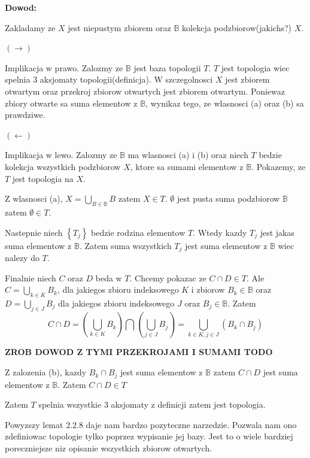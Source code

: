 \documentclass{article}
\begin{document}
\textbf{Dowod:}

Zakladamy ze $X$ jest niepustym zbiorem oraz $\mathbb{B}$ kolekcja podzbiorow(jakichs?) $X$.

$(\rightarrow)$

Implikacja w prawo. Zalozmy ze $\mathbb{B}$ jest baza topologii $T$. $T$ jest topologia wiec spelnia 3 aksjomaty topologii(definicja). W szczegolnosci $X$ jest zbiorem otwartym oraz przekroj zbiorow otwartych jest zbiorem otwartym. Poniewaz zbiory otwarte sa suma elementow z $\mathbb{B}$, wynikaz tego, ze wlasnosci (a) oraz (b) sa prawdziwe.

$(\leftarrow)$

Implikacja w lewo. Zalozmy ze $\mathbb{B}$ ma wlasnosci (a) i (b) oraz niech $T$ bedzie kolekcja wszystkich podzbiorow $X$, ktore sa sumami elementow z $\mathbb{B}$. Pokazemy, ze $T$ jest topologia na $X$.

Z wlasnosci (a), $X = \bigcup\limits_{B \in \mathbb{B}}B$ zatem  $X \in T$. $\emptyset$ jest pusta suma podzbiorow $\mathbb{B}$ zatem $\emptyset \in T$.

Nastepnie niech $\left\{ T_{j} \right\}$ bedzie rodzina elementow $T$. Wtedy kazdy $T_{j}$ jest jakas suma elementow z $\mathbb{B}$. Zatem suma wszystkich $T_{j}$ jest suma elementow z $\mathbb{B}$ wiec nalezy do $T$.

Finalnie niech $C$ oraz $D$ beda w $T$. Chcemy pokazac ze $C \cap D \in T$. Ale $C = \bigcup\limits_{k \in K}B_{k}$, dla jakiegos zbioru indeksowego $K$ i zbiorow $B_{k} \in \mathbb{B}$ oraz $D = \bigcup\limits_{j \in J}B_{j}$ dla jakiegos zbioru indeksowego $J$ oraz $B_{j} \in \mathbb{B}$. Zatem $$ C \cap D = \left(\bigcup\limits_{k \in K}B_{k}\right) \bigcap \left( \bigcup\limits_{j \in J}B_{j} \right) = \bigcup\limits_{k \in K, j \in J}(B_{k} \cap B_{j})$$

\textbf{ZROB DOWOD Z TYMI PRZEKROJAMI I SUMAMI TODO}

Z zalozenia (b), kazdy $B_{k} \cap B_{j}$ jest suma elementow z $\mathbb{B}$ zatem $C \cap D$ jest suma elementow z $\mathbb{B}$. Zatem $C \cap D \in T$ 

Zatem $T$ spelnia wszystkie 3 aksjomaty z definicji zatem jest topologia.

\vspace{1cm}

Powyzszy lemat 2.2.8 daje nam bardzo pozyteczne narzedzie. Pozwala nam ono zdefiniowac topologie tylko poprzez wypisanie jej bazy. Jest to o wiele bardziej poreczniejsze niz opisanie wszystkich zbiorow otwartych.
\end{document}
